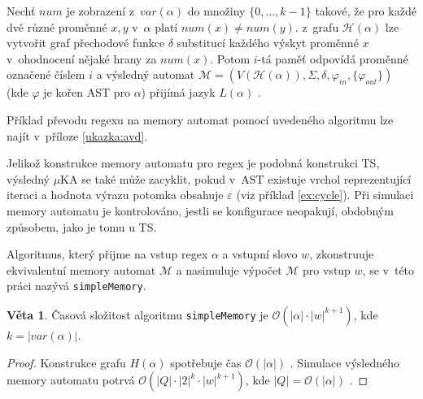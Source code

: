 \documentclass[thesis=B,czech]{FITthesis}[2019/12/23]
\theoremstyle{definition}
\newtheorem{theorem}{Věta}[chapter]
\begin{document}
Nechť $num$ je zobrazení z~$var(\alpha)$ do množiny $\{0, \dots, k-1\}$ takové, že pro každé dvě různé proměnné $x, y$ v~$\alpha$ platí $num(x) \ne num(y)$. z~grafu $\mathcal{H}(\alpha)$ lze vytvořit graf přechodové funkce $\delta$ substitucí každého výskyt proměnné $x$ v~ohodnocení nějaké hrany za $num(x)$. Potom $i$-tá paměť odpovídá proměnné označené číslem $i$ a výsledný automat $\mathcal{M} = (V(\mathcal{H}(\alpha)), \Sigma, \delta, \varphi_{in}, \{\varphi_{out}\})$ (kde $\varphi$ je kořen AST pro $\alpha$) přijímá jazyk $L(\alpha)$ \cite[s. 5]{schmidref}.

Příklad převodu regexu na memory automat pomocí uvedeného algoritmu lze najít v~příloze \ref{ukazka:avd}.

Jelikož konstrukce memory automatu pro regex je podobná konstrukci TS, výsledný $\mu$KA se také může zacyklit, pokud v~AST existuje vrchol reprezentující iteraci a hodnota výrazu potomka obsahuje $\varepsilon$ (viz příklad \ref{ex:cycle}). Při simulaci memory automatu je kontrolováno, jestli se konfigurace neopakují, obdobným způsobem, jako je tomu u TS.  

Algoritmus, který přijme na vstup regex $\alpha$ a vstupní slovo $w$, zkonstruuje ekvivalentní memory automat $\mathcal{M}$ a nasimuluje výpočet $\mathcal{M}$ pro vstup $w$, se v~této práci nazývá \texttt{simpleMemory}.

\begin{theorem}\label{thm:simplemem}
Časová složitost algoritmu \texttt{simpleMemory} je $\mathcal{O}(|\alpha|\cdot|w|^{k+1})$, kde $k = |var(\alpha)|$.
\end{theorem}
\begin{proof} Konstrukce grafu $H(\alpha)$ spotřebuje čas $\mathcal{O}(|\alpha|)$ \cite[lemma 3]{schmidref}. Simulace výsledného memory automatu potrvá $\mathcal{O}(|Q|\cdot|2|^k\cdot|w|^{k+1})$, kde $|Q| = \mathcal{O}(|\alpha|)$ \cite[lemma~2]{schmidref}.
\end{proof}

\iffalse
\end{document}
